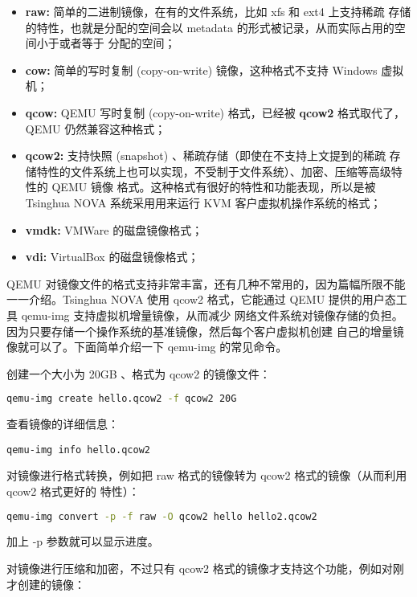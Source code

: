 \begin{itemize}
    \item \textbf{raw:} 简单的二进制镜像，在有的文件系统，比如 xfs 和 ext4 上支持稀疏
    存储的特性，也就是分配的空间会以 metadata 的形式被记录，从而实际占用的空间小于或者等于
    分配的空间；
    \item \textbf{cow:} 简单的写时复制 (copy-on-write) 镜像，这种格式不支持 Windows
    虚拟机；
    \item \textbf{qcow:} QEMU 写时复制 (copy-on-write) 格式，已经被 \textbf{qcow2}
    格式取代了，QEMU 仍然兼容这种格式；
    \item \textbf{qcow2:} 支持快照 (snapshot) 、稀疏存储（即使在不支持上文提到的稀疏
    存储特性的文件系统上也可以实现，不受制于文件系统）、加密、压缩等高级特性的 QEMU 镜像
    格式。这种格式有很好的特性和功能表现，所以是被 Tsinghua NOVA 系统采用用来运行 KVM
    客户虚拟机操作系统的格式；
    \item \textbf{vmdk:} VMWare 的磁盘镜像格式；
    \item \textbf{vdi:} VirtualBox 的磁盘镜像格式；
\end{itemize}

QEMU 对镜像文件的格式支持非常丰富，还有几种不常用的，因为篇幅所限不能一一介绍。Tsinghua NOVA
使用 qcow2 格式，它能通过 QEMU 提供的用户态工具 qemu-img 支持虚拟机增量镜像，从而减少
网络文件系统对镜像存储的负担。因为只要存储一个操作系统的基准镜像，然后每个客户虚拟机创建
自己的增量镜像就可以了。下面简单介绍一下 qemu-img 的常见命令。

创建一个大小为 20GB 、格式为 qcow2 的镜像文件：

\begin{lstlisting}[language=bash]
qemu-img create hello.qcow2 -f qcow2 20G
\end{lstlisting}

查看镜像的详细信息：

\begin{lstlisting}
qemu-img info hello.qcow2
\end{lstlisting}

对镜像进行格式转换，例如把 raw 格式的镜像转为 qcow2 格式的镜像（从而利用 qcow2 格式更好的
特性）：

\begin{lstlisting}[language=bash]
qemu-img convert -p -f raw -O qcow2 hello hello2.qcow2
\end{lstlisting}

加上 -p 参数就可以显示进度。

对镜像进行压缩和加密，不过只有 qcow2 格式的镜像才支持这个功能，例如对刚才创建的镜像：

